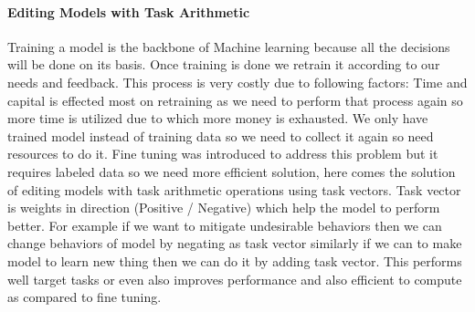 \documentclass[conference]{IEEEtran}
\begin{document}
\paragraph{Editing Models with Task Arithmetic} Training a model is the backbone of Machine learning because all the decisions will be done on its basis. Once training is done we retrain it according to our needs and feedback. This process is very costly due to following factors:
Time and capital is effected most on retraining as we need to perform that process again so more time is utilized due to which more money is exhausted. We only have trained model instead of training data so we need to collect it again so need resources to do it.
Fine tuning was introduced to address this problem but it requires labeled data so we need more efficient solution, here comes the solution of editing models with task arithmetic operations using task vectors. Task vector is weights in direction (Positive / Negative) which help the model to perform better.
For example if we want to mitigate undesirable behaviors then we can change behaviors of model by negating as task vector similarly if we can to make model to learn new thing then we can do it by adding task vector. This performs well target tasks or even also improves performance and also efficient to compute as compared to fine tuning.
\end{document}

